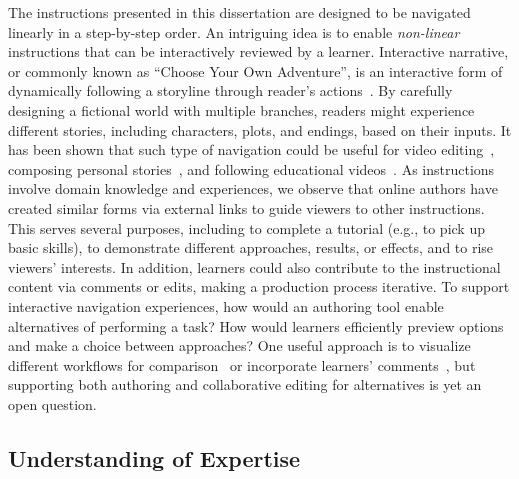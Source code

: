 The instructions presented in this dissertation are designed to be navigated linearly in a step-by-step order. An intriguing idea is to enable \emph{non-linear} instructions that can be interactively reviewed by a learner. Interactive narrative, or commonly known as ``Choose Your Own Adventure'', is an interactive form of dynamically following a storyline through reader's actions~\cite{RiedlInteractivenarrative}. By carefully designing a fictional world with multiple branches, readers might experience different stories, including characters, plots, and endings, based on their inputs.
%
It has been shown that such type of navigation could be useful for video editing~\cite{Shen:2009:WNE:1518701.1518825}, composing personal stories~\cite{Chi:2011:IAC:1943403.1943438}, and following educational videos~\cite{Kim:2014:DIT:2642918.2647389}.
%
As instructions involve domain knowledge and experiences, we observe that online authors have created similar forms via external links to guide viewers to other instructions. This serves several purposes, including to complete a tutorial (e.g., to pick up basic skills), to demonstrate different approaches, results, or effects, and to rise viewers' interests.
%
In addition, learners could also contribute to the instructional content via comments or edits, making a production process iterative.
To support interactive navigation experiences, how would an authoring tool enable alternatives of performing a task? How would learners efficiently preview options and make a choice between approaches?
%
One useful approach is to visualize different workflows for comparison~\cite{Kong:2012:DTR:2207676.2208549} or incorporate learners' comments~\cite{Bunt:2014:TPI:2556288.2557118}, but supporting both authoring and collaborative editing for alternatives is yet an open question.

\subsection{Understanding of Expertise}

